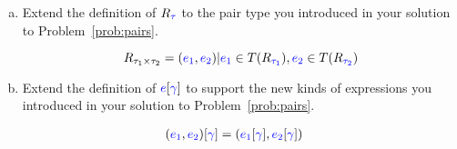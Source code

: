 \documentclass{article}
\newcommand{\meta}[1]{{\color{blue}#1}}
\begin{document}
\begin{enumerate}[resume*]
\begin{enumerate}[(a)]
  \item Extend the definition of $R_{\meta{\tau}}$ to the pair type you introduced in your solution to Problem~\ref{prob:pairs}.

    $$R_{\tau_1 \times \tau_2}=\set{(\meta{e_1}, \meta{e_2}) | \meta{e_1} \in T(R_{\meta{\tau_1}}), \meta{e_2} \in T(R_{\meta{\tau_2}})}$$

  \item Extend the definition of $\meta{e}[\meta{\gamma}]$ to support the new
    kinds of expressions you introduced in your solution to
    Problem~\ref{prob:pairs}.

    \begin{align*}
      (\meta{e_1}, \meta{e_2})[\meta{\gamma}] &= (\meta{e_1}[\meta{\gamma}], \meta{e_2}[\meta{\gamma}])
    \end{align*}


\end{enumerate}
\end{enumerate}
\end{document}
